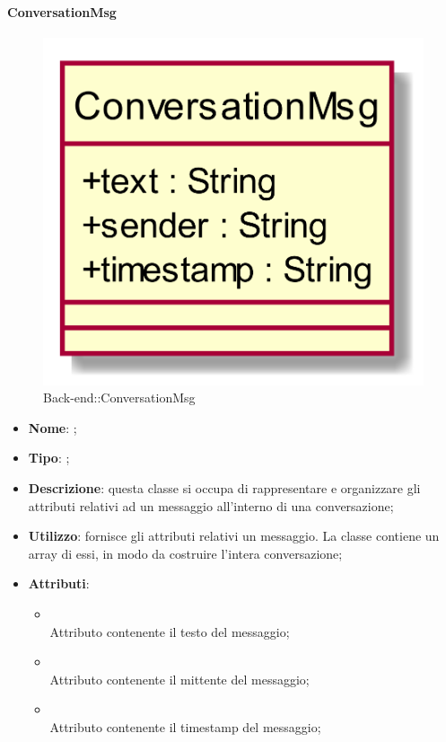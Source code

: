 \hypertarget{ConversationMsg_label}{\paragraph{ConversationMsg}}
\begin{figure}[h]
	\centering
	\includegraphics[width=\textwidth,height=\textheight,keepaspectratio]{images/ClassConversationMsg.png}
	\caption{Back-end::ConversationMsg}
\end{figure}
\begin{itemize}
	\item \textbf{Nome}: ;
	\item \textbf{Tipo}: ;
	\item \textbf{Descrizione}: questa classe si occupa di rappresentare e organizzare gli attributi relativi ad un messaggio all'interno di una conversazione;
	\item \textbf{Utilizzo}: fornisce gli attributi relativi un messaggio. La classe  contiene un array di essi, in modo da costruire l'intera conversazione;
	\item \textbf{Attributi}:
	\begin{itemize}
		\item[]  \\
		Attributo contenente il testo del messaggio;
		\item[]  \\
		Attributo contenente il mittente del messaggio;
		\item[]  \\
		Attributo contenente il timestamp del messaggio;
	\end{itemize}
\end{itemize}

